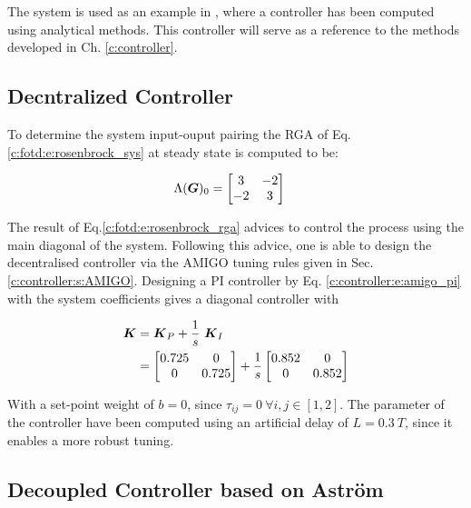The system is used as an example in \cite{Astrom2001a}, where a controller has been computed using analytical methods. This controller will serve as a reference to the methods developed in Ch. \ref{c:controller}. 

\subsection{Decntralized Controller}%
\label{c:fotd:s:rosebrock:sub:decentral}

To determine the system input-ouput pairing the RGA of Eq.\ref{c:fotd:e:rosenbrock_sys} at steady state is computed to be:

\begin{align}
\begin{split}
\Lambda(\mbox{\boldmath$G$})_0 &= \begin{bmatrix}
3 & -2 \\
-2 & 3
\end{bmatrix} 
\end{split}
\label{c:fotd:e:rosenbrock_rga}
\end{align}

The result of Eq.\ref{c:fotd:e:rosenbrock_rga} advices to control the process using the main diagonal of the system. Following this advice, one is able to design the decentralised controller via the AMIGO tuning rules given in Sec. \ref{c:controller:s:AMIGO}. Designing a PI controller by Eq. \ref{c:controller:e:amigo_pi} with the system coefficients gives a diagonal controller with

\begin{align}
\mbox{\boldmath$K$} &= \mbox{\boldmath$K$}_P + \frac{1}{s}~ \mbox{\boldmath$K$}_I\\
&= \begin{bmatrix}
0.725 & 0 \\
0 & 0.725
\end{bmatrix}
+ \frac{1}{s}\begin{bmatrix}
0.852 & 0 \\
0 & 0.852
\end{bmatrix}
\end{align}

With a set-point weight of $ b = 0 $, since $\tau_{ij} = 0 ~\forall i,j \in [1,2]$. The parameter of the controller have been computed using an artificial delay of $L = 0.3~T$, since it enables a more robust tuning.

\subsection{Decoupled Controller based on Astr\"om}%
\label{c:fotd:s:rosebrock:sub:astrom}

